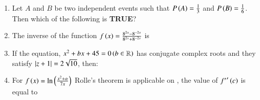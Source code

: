 \documentclass[journal,12pt,onecolumn]{IEEEtran}
\theoremstyle{remark}
\begin{document}
\begin{enumerate}
\item Let $A$ and $B$ be two independent events such that $P\left(A\right)=\frac{1}{3}$ and $P\left(B\right)=\frac{1}{6}$. Then which of the following is \textbf{TRUE}?

\hfill{}
\begin{enumerate}
\end{enumerate}

\item The inverse of the function $f\left(x\right)=\frac{8^{2x}-8^{-2x}}{8^{2x}+8^{-2x}}$ is

\hfill{}
\begin{enumerate}
\end{enumerate}

\item If the equation, $x^2+bx+45=0 \left(b\in\mathbb{R}\right)$ has conjugate complex roots and they satisfy $\left\vert z+1\right\vert=2\sqrt{10}$, then:

\hfill{}
\begin{enumerate}
\end{enumerate}

\item For $f\left(x\right)=\ln\left(\frac{x^2+\alpha}{7x}\right)$ Rolle's theorem is applicable on , the value of ${f^\prime}^\prime\left(c\right)$ is equal to


\end{enumerate}
\end{document}
